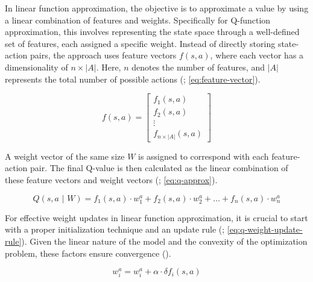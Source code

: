         \bigskip
        
        
        \noindent In linear function approximation, the objective is to approximate a value by using a linear combination of features and weights. Specifically for Q-function approximation, this involves representing the state space through a well-defined set of features, each assigned a specific weight. Instead of directly storing state-action pairs, the approach uses feature vectors $f(s,a)$, where each vector has a dimensionality of $n \times |A|$. Here, $n$ denotes the number of features, and $|A|$ represents the total number of possible actions (\textcolor{deepblue}{\cite{valuemethods}; \autoref{eq:feature-vector}}).
        
        \begin{equation}
                f(s,a) = \begin{bmatrix}
                f_1(s,a) \\
                f_2(s,a) \\
                \vdots \\
                f_{n \times |A|}(s,a)
                \end{bmatrix}
            \label{eq:feature-vector}
        \end{equation}
        
        \noindent A weight vector of the same size $W$ is assigned to correspond with each feature-action pair. The final Q-value is then calculated as the linear combination of these feature vectors and weight vectors (\textcolor{deepblue}{\cite{valuemethods}; \autoref{eq:q-approx}}).
        
        \begin{equation}
            Q(s, a \text{ | } W) = f_1(s, a) \cdot w_1^a + f_2(s, a) \cdot w_2^a + \hdots + f_n(s, a) \cdot w_n^a
            \label{eq:q-approx}
        \end{equation}
        
        \noindent For effective weight updates in linear function approximation, it is crucial to start with a proper initialization technique and an update rule (\textcolor{deepblue}{\cite{valuemethods}; \autoref{eq:q-weight-update-rule}}). Given the linear nature of the model and the convexity of the optimization problem, these factors ensure convergence (\textcolor{deepblue}{\cite{2010Szepesvari}}).
        
        \begin{equation}
            w_i^a = w_i^a + \alpha \cdot \delta f_i(s, a)
            \label{eq:q-weight-update-rule}
        \end{equation}
        
